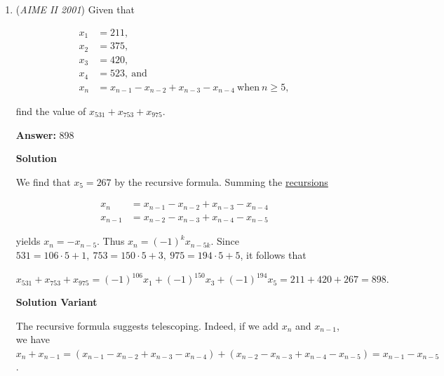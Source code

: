 \begin{enumerate}
 
 \[S+F- S \cap F = S \cup F = 2001\]

 For $m = S \cap F$ to be smallest, $S$ and $F$ must be minimized.

 
 \[1601 + 601 - m = 2001 \Longrightarrow m = 201\]

 For $M = S \cap F$ to be largest, $S$ and $F$ must be maximized.

 
 \[1700 + 800 - M = 2001 \Longrightarrow M = 499\]

 Therefore, the answer is $M - m = 499 - 201 = \boxed{298}$.

 


	\item (\textit{AIME II 2001}) Given that

 \begin{align*}x_{1}&=211,\\ x_{2}&=375,\\ x_{3}&=420,\\ x_{4}&=523,\ \text{and}\\ x_{n}&=x_{n-1}-x_{n-2}+x_{n-3}-x_{n-4}\ \text{when}\ n\geq5, \end{align*}

find the value of $x_{531}+x_{753}+x_{975}$.


 
 \textbf{Answer: }898



\textbf{Solution}

We find that $x_5 = 267$ by the recursive formula. Summing the \href{https://artofproblemsolving.com/wiki/index.php?title=Recursion}{recursions}

 
 \begin{align*} x_{n}&=x_{n-1}-x_{n-2}+x_{n-3}-x_{n-4} \\ x_{n-1}&=x_{n-2}-x_{n-3}+x_{n-4}-x_{n-5} \end{align*}


 yields $x_{n} = -x_{n-5}$. Thus $x_n = (-1)^k x_{n-5k}$. Since $531 = 106 \cdot 5 + 1,\ 753 = 150 \cdot 5 + 3,\ 975 = 194 \cdot 5 + 5$, it follows that

 
 \[x_{531} + x_{753} + x_{975} = (-1)^{106} x_1 + (-1)^{150} x_3 + (-1)^{194} x_5 = 211 + 420 + 267 = \boxed{898}.\]




\textbf{Solution Variant}

The recursive formula suggests telescoping. Indeed, if we add $x_n$ and $x_{n-1}$, we have $x_n + x_{n-1} = (x_{n-1} - x_{n-2} + x_{n-3} - x_{n-4}) + (x_{n-2} - x_{n-3} + x_{n-4} - x_{n-5}) = x_{n-1} - x_{n-5}$. 


\end{enumerate}
